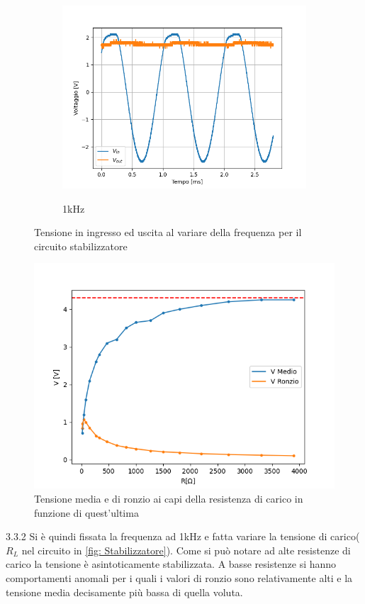 \begin{figure}
\begin{subfigure}{0.32\textwidth}
		\includegraphics[width=\textwidth]{freq3.png}
		\label{s}
		\caption{1\unit{\kHz}}
	\end{subfigure}
	\caption{Tensione in ingresso ed uscita al variare della frequenza per il circuito stabilizzatore}
	\label{raddr}
\end{figure}
\begin{figure}
	\centering
	\includegraphics[scale=0.5]{Ripple semionda.png}
	\caption{Tensione media e di ronzio ai capi della resistenza di carico in funzione di quest'ultima}
	\label{ripple semi}
\end{figure}
\begin{subsection}{3.3.2}
	Si è quindi fissata la frequenza ad 1\unit{\kHz} e fatta variare la tensione di carico($R_L$ nel circuito in \ref{fig: Stabilizzatore}). Come si può notare ad alte resistenze di carico la tensione è asintoticamente stabilizzata. A basse resistenze si hanno comportamenti anomali per i quali i valori di ronzio sono relativamente alti e la tensione media decisamente più bassa di quella voluta.
\end{subsection}
